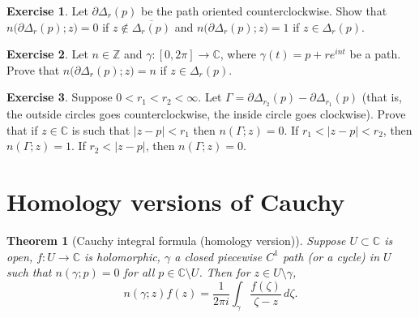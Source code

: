 \documentclass[12pt,openany]{book}
\newcommand{\sabs}[1]{\lvert {#1} \rvert}
\newcommand{\C}{{\mathbb{C}}}
\newcommand{\Z}{{\mathbb{Z}}}
\theoremstyle{plain}
\newtheorem{thm}{Theorem}[section]
\theoremstyle{remark}
\theoremstyle{definition}
\newenvironment{exbox}{%
    \def\FrameCommand{\vrule width 1pt \relax\hspace{10pt}}%
    \MakeFramed{\advance\hsize-\width\FrameRestore}%
}{%
    \endMakeFramed
}
\theoremstyle{exercise}
\newtheorem{exercise}{Exercise}[section]
\theoremstyle{example}
\begin{document}
\begin{exbox}
\begin{exercise} \label{exercise:windingcircle}
Let $\partial \Delta_r(p)$ be the path oriented counterclockwise.
Show that $n\bigl(\partial \Delta_r(p);z\bigr) = 0$ if $z \notin
\overline{\Delta_r(p)}$ and 
$n\bigl(\partial \Delta_r(p);z\bigr) = 1$ if $z \in \Delta_r(p)$.
\end{exercise}

\begin{exercise}
Let $n \in \Z$ and $\gamma \colon [0,2\pi] \to \C$, where
$\gamma(t) = p + re^{in t}$ be a path.
Prove that
$n\bigl(\partial \Delta_r(p);z\bigr) = n$ if $z \in \Delta_r(p)$.
\end{exercise}

\begin{exercise} \label{exercise:windingcircles}
Suppose $0 < r_1 < r_2 < \infty$.
Let $\Gamma = \partial \Delta_{r_2}(p) - \partial \Delta_{r_1} (p)$
(that is, the outside circles goes counterclockwise, the inside circle goes
clockwise).
Prove that if $z \in \C$ is such that $\sabs{z-p} < r_1$ then
$n(\Gamma;z) = 0$.  If $r_1 < \sabs{z-p} < r_2$, then
$n(\Gamma;z) = 1$.  If $r_2 < \sabs{z-p}$, then
$n(\Gamma;z) = 0$.
\end{exercise}
\end{exbox}



\section{Homology versions of Cauchy}


\begin{thm}[Cauchy integral formula (homology version)]
\label{thm:CIFhomology}
Suppose $U \subset \C$ is open, $f \colon U \to \C$ is holomorphic,
$\gamma$ a closed piecewise $C^1$ path (or a cycle) in $U$
such that $n(\gamma;p) = 0$ for all $p \in \C \setminus U$.
Then for $z \in U \setminus \gamma$,
\begin{equation*}
n(\gamma;z)
f(z)
=
\frac{1}{2\pi i}
\int_{\gamma}
\frac{f(\zeta)}{\zeta-z}
\,
d \zeta .
\end{equation*}
\end{thm}
\end{document}
